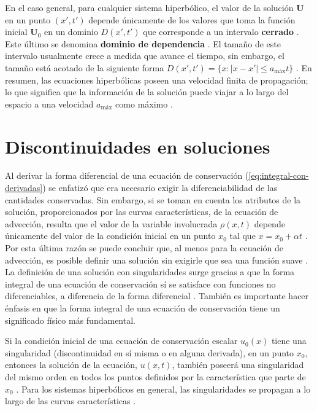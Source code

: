 En el caso general, para cualquier sistema hiperbólico, el valor de la solución $\mathbf{U}$ en un punto $(x',t')$ depende únicamente de los valores que toma la función inicial $\mathbf{U}_0$ en un dominio $D(x',t')$ que corresponde a un intervalo \textbf{cerrado} \cite{Leveque}. Este último se denomina \textbf{dominio de dependencia} \cite{Leveque}. El tamaño de este intervalo usualmente crece a medida que avance el tiempo, sin embargo, el tamaño está acotado de la siguiente forma $D(x',t') = \{x : |x-x'| \leq a_{\text{máx}}t \}$ \cite{Leveque}. En resumen, las ecuaciones hiperbólicas poseen una velocidad finita de propagación; lo que significa que la información de la solución puede viajar a lo largo del espacio a una velocidad $a_{\text{máx}}$ como máximo \cite{Leveque}.

\section{Discontinuidades en soluciones}
Al derivar la forma diferencial de una ecuación de conservación (\ref{eq:integral-con-derivadas}) se enfatizó que era necesario exigir la diferenciabilidad de las cantidades conservadas. Sin embargo, si se toman en cuenta los atributos de la solución, proporcionados por las curvas características, de la ecuación de advección, resulta que el valor de la variable involucrada $\rho(x,t)$ depende únicamente del valor de la condición inicial en un punto $x_0$ tal que $x = x_0 + \alpha t$ \cite{Leveque}. Por esta última razón se puede concluir que, al menos para la ecuación de advección, es posible definir una solución sin exigirle que sea una función  suave \cite{Leveque}. La definición de una solución con singularidades surge gracias a que la forma integral de una ecuación de conservación sí se satisface con funciones no diferenciables, a diferencia de la forma diferencial \cite{Leveque}. También es importante hacer énfasis en que la forma integral de una ecuación de conservación tiene un significado físico más fundamental.

Si la condición inicial de una ecuación de conservación escalar $u_0(x)$ tiene una singularidad (discontinuidad en sí misma o en alguna derivada), en un punto $x_0$, entonces la solución de la ecuación, $u(x,t)$, también poseerá una singularidad del mismo orden en todos los puntos definidos por la característica que parte de $x_0$ \cite{Leveque}. Para los sistemas hiperbólicos en general, las singularidades se propagan a lo largo de las curvas características \cite{Leveque}.

